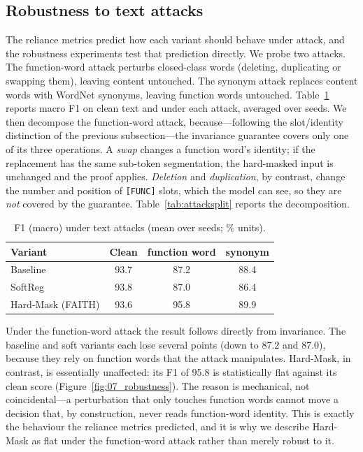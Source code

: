 \documentclass[10pt,twocolumn]{article}
\begin{document}
\subsection{Robustness to text attacks}
The reliance metrics predict how each variant should behave under attack, and the robustness experiments test that prediction directly. We probe two attacks. The function-word attack perturbs closed-class words (deleting, duplicating or swapping them), leaving content untouched. The synonym attack replaces content words with WordNet \cite{wordnet} synonyms, leaving function words untouched. Table~\ref{tab:robust} reports macro F1 on clean text and under each attack, averaged over seeds. We then decompose the function-word attack, because---following the slot/identity distinction of the previous subsection---the invariance guarantee covers only one of its three operations. A \emph{swap} changes a function word's identity; if the replacement has the same sub-token segmentation, the hard-masked input is unchanged and the proof applies. \emph{Deletion} and \emph{duplication}, by contrast, change the number and position of \texttt{[FUNC]} slots, which the model can see, so they are \emph{not} covered by the guarantee. Table~\ref{tab:attacksplit} reports the decomposition.

\begin{table}[tb]\centering
\caption{F1 (macro) under text attacks (mean over seeds; \% units).}
\label{tab:robust}
\footnotesize
\begin{tabular}{lccc}
\toprule
Variant & Clean & function word & synonym \\
\midrule
Baseline & 93.7 & 87.2 & 88.4 \\
SoftReg & 93.8 & 87.0 & 86.4 \\
Hard-Mask (FAITH) & 93.6 & 95.8 & 89.9 \\
\bottomrule
\end{tabular}
\end{table}

Under the function-word attack the result follows directly from invariance. The baseline and soft variants each lose several points (down to 87.2 and 87.0), because they rely on function words that the attack manipulates. Hard-Mask, in contrast, is essentially unaffected: its F1 of 95.8 is statistically flat against its clean score (Figure~\ref{fig:07_robustness}). The reason is mechanical, not coincidental---a perturbation that only touches function words cannot move a decision that, by construction, never reads function-word identity. This is exactly the behaviour the reliance metrics predicted, and it is why we describe Hard-Mask as flat under the function-word attack rather than merely robust to it.
\end{document}
